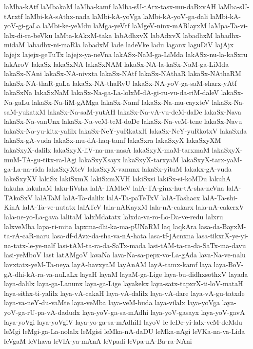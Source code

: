 {laMba-kAtf
laMbakaM
laMba-kamf
laMba-sU-tArx-tasx-mu-daBxvAH
laMba-sU-tArxtf
laMbi-kA-sAthx-nada
laMbi-kA-yoVga
laMbi-kA-yoV-ga-dali
laMbi-kA-yoV-gi-gaLa
laMbi-ke-yeMdu
laMga-yeVtf
laMgeV-ninx-mARlayxM
laMpa-Ta-vi-lalx-di-ra-beVku
laMta-kAkxM-taka
labAdhxvX
labAdxvX
labadhxM
labadhx-midaM
labadhx-ni-maRla
labadxM
lade
ladeVke
ladu
laganx
laguDiV
lajAjx
lajejx
lajejx-geTuTx
lajejx-ya-neVna
lakASx-NaM-ga-LiMda
lakASx-nu-la-kaSxru
lakAroV
lakaSx
lakaSxNA
lakaSxNAM
lakaSx-NA-la-kaSx-NaM-ga-LiMda
lakaSx-NAni
lakaSx-NA-nivxta
lakaSx-NAtf
lakaSx-NAthaR
lakaSx-NAthaRM
lakaSx-NA-thaR-gaLa
lakaSx-NA-thaRvU
lakaSx-NA-yoV-ga-saM-sharx-yAtf
lakaSxNa
lakaSxNaM
lakaSx-Na-ga-La-lolxM-dA-gi-ru-vu-da-riM-daleV
lakaSx-Na-gaLu
lakaSx-Na-liM-gAMga
lakaSx-Namf
lakaSx-Na-mu-cayxteV
lakaSx-Na-saM-yukatxM
lakaSx-Na-saM-yutAH
lakaSx-Na-vA-vu-deM-daDe
lakaSx-Nava
lakaSx-Na-vanUnx
lakaSx-Na-veM-teM-doDe
lakaSx-Na-veM-tene
lakaSx-Navu
lakaSx-Na-yu-kitx-yalilx
lakaSx-NeY-yuRkatxH
lakaSx-NeY-yuRkotxV
lakaSxda
lakaSx-gA-vuda
lakaSx-mu-dA-haq-tamf
lakaSxra
lakaSxyX
lakaSxyXM
lakaSxyX-dalilx
lakaSxyX-liV-na-ma-nasA
lakaSxyX-maM-tarxmaM
lakaSxyX-muM-TA-gu-titx-ra-lAgi
lakaSxyXsayx
lakaSxyX-tarxyaM
lakaSxyX-tarx-yaM-ga-La-na-rida
lakaSxyXteV
lakaSxyX-vanunx
lakaSx-yituM
lakakx-gA-vuda
lakeSxyXV
lakiSx
lakiSxmX
lakiSxmXVH
lakiSxsi
lakiSx-si-koMDu
lakuhA
lakuha
lakuhaM
laku-liVsha
lalA-TAMteV
lalA-TA-ginx-hu-tA-sha-neVna
lalA-TAkoSxV
lalATaM
lalA-Ta-dalilx
lalA-Ta-paTeTxV
lalA-Tashacx
lalA-Ta-shi-KinA
lalA-Ta-ve-nutatx
lalATeV
lala-nAKayxM
lala-nA-cakarx
lala-nA-cakerxV
lala-ne-yo-La-gava
lalitaM
lalxMdatatx
lalxda-va-ro-Lo-Da-ve-redu
lalxru
lalxveMba
lapa-ri-mita
lapxma-dhi-ka-ma-pUNaRM
laq
laqkAra
lasa-da-BayxM-ta-rA-caR-naru
lasa-df-dAvx-da-sha-va-nA-hata
lasa-tf-jAcnxna
lasa-tikxrX-ye-yi-na-tatx-le-ye-nalf
lasi-tAM-ta-ra-da-SaTx-mada
lasi-tAM-ta-ra-da-SaTx-ma-davu
lasi-yeMboV
last
latAMgoV
lavaNa
lava-Na-sa-pepx-vo-La-gAda
lava-Na-ve-nalu
lavxtatx-yeM-Ta-neya
layA-havxyaM
layAnAM
layA-tamx-kamf
laya
laya-BoV-gA-dhi-kA-ra-va-nuLaLx
layaH
layaM
layaM-ga-Lige
laya-bu-didhxsothxV
layada
laya-dalilx
laya-ga-Lanunx
laya-ga-Lige
layakekx
laya-satx-tapxrX-ti-loV-mataH
laya-sithx-ti-yalilx
laya-vA-cakaH
laya-vA-dalilx
laya-vA-dare
laya-vA-gu-tatxde
laya-va-neY-du-vaMte
laya-veMba
laya-veM-buda
laya-vilalx
laya-yoVga
laya-yoV-ga-rU-pa-vA-dadudx
laya-yoV-ga-sa-mAdhi
laya-yoV-gasayx
laya-yoV-gavA
laya-yoVgi
laya-yoVgiV
laya-yo-ga-sa-mAdhiH
layoV
le
leDe-yi-lalx-veM-deMdu
leMgi
leMgi-ga-La-nolalx
leMgisi
leMka-nA-daDU
leMka-nAgi
leVKa-na-va-Lida
leVgaM
leVhava
leVlA-ya-mAnA
leVpadi
leVpa-nA-Ba-ra-NAni
}

